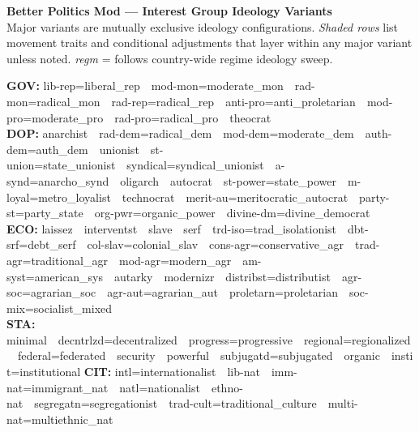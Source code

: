 \documentclass[a4paper]{article}
\begin{document}
\pagestyle{empty}

\begin{center}
{\large\bfseries Better Politics Mod --- Interest Group Ideology Variants}\\[3pt]
{\small Major variants are mutually exclusive ideology configurations.
\colorbox{minorRow}{\textit{Shaded rows}} list movement traits and conditional adjustments that layer within any major variant unless noted.
\quad\textit{regm} = follows country-wide regime ideology sweep.}
\end{center}

\vspace{2pt}

{\scriptsize\noindent
\textbf{GOV:} lib-rep=liberal\_rep~\textbullet~mod-mon=moderate\_mon~\textbullet~rad-mon=radical\_mon~\textbullet~rad-rep=radical\_rep~\textbullet~anti-pro=anti\_proletarian~\textbullet~mod-pro=moderate\_pro~\textbullet~rad-pro=radical\_pro~\textbullet~theocrat\\
\textbf{DOP:} anarchist~\textbullet~rad-dem=radical\_dem~\textbullet~mod-dem=moderate\_dem~\textbullet~auth-dem=auth\_dem~\textbullet~unionist~\textbullet~st-union=state\_unionist~\textbullet~syndical=syndical\_unionist~\textbullet~a-synd=anarcho\_synd~\textbullet~oligarch~\textbullet~autocrat~\textbullet~st-power=state\_power~\textbullet~m-loyal=metro\_loyalist~\textbullet~technocrat~\textbullet~merit-au=meritocratic\_autocrat~\textbullet~party-st=party\_state~\textbullet~org-pwr=organic\_power~\textbullet~divine-dm=divine\_democrat\\
\textbf{ECO:} laissez~\textbullet~interventst~\textbullet~slave~\textbullet~serf~\textbullet~trd-iso=trad\_isolationist~\textbullet~dbt-srf=debt\_serf~\textbullet~col-slav=colonial\_slav~\textbullet~cons-agr=conservative\_agr~\textbullet~trad-agr=traditional\_agr~\textbullet~mod-agr=modern\_agr~\textbullet~am-syst=american\_sys~\textbullet~autarky~\textbullet~modernizr~\textbullet~distribst=distributist~\textbullet~agr-soc=agrarian\_soc~\textbullet~agr-aut=agrarian\_aut~\textbullet~proletarn=proletarian~\textbullet~soc-mix=socialist\_mixed\\
\textbf{STA:} minimal~\textbullet~decntrlzd=decentralized~\textbullet~progress=progressive~\textbullet~regional=regionalized~\textbullet~federal=federated~\textbullet~security~\textbullet~powerful~\textbullet~subjugatd=subjugated~\textbullet~organic~\textbullet~instit=institutional\quad
\textbf{CIT:} intl=internationalist~\textbullet~lib-nat~\textbullet~imm-nat=immigrant\_nat~\textbullet~natl=nationalist~\textbullet~ethno-nat~\textbullet~segregatn=segregationist~\textbullet~trad-cult=traditional\_culture~\textbullet~multi-nat=multiethnic\_nat\\
}
\end{document}
